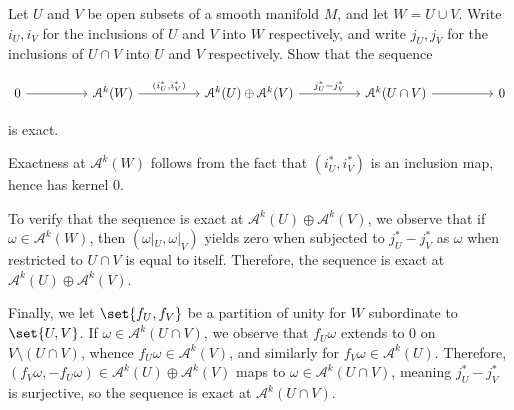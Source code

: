 \documentclass[10pt]{mypackage}
\begin{document}
\begin{problem}[Problem 6]
  Let $U$ and $V$ be open subsets of a smooth manifold $M$, and let $W = U\cup V$. Write $i_U,i_V$ for the inclusions of $U$ and $V$ into $W$ respectively, and write $j_U,j_V$ for the inclusions of $U\cap V$ into $U$ and $V$ respectively. Show that the sequence 
  \begin{center}
\[\begin{tikzcd}
	0 && {\mathcal{A}^k(W)} && {\mathcal{A}^{k}(U)\oplus\mathcal{A}^{k}(V)} && {\mathcal{A}^{k}(U\cap V)} && 0
	\arrow[from=1-1, to=1-3]
	\arrow["{\left(i_U^{\ast},i_V^{\ast}\right)}", from=1-3, to=1-5]
	\arrow["{j_U^{\ast}-j_V^{\ast}}", from=1-5, to=1-7]
	\arrow[from=1-7, to=1-9]
\end{tikzcd}\]
  \end{center}
  is exact.
\end{problem}
\begin{solution}
  Exactness at $\mathcal{A}^{k}\left( W \right)$ follows from the fact that $\left( i_U^{\ast},i_V^{\ast} \right)$ is an inclusion map, hence has kernel $0$.\newline

  To verify that the sequence is exact at $\mathcal{A}^{k}\left( U \right)\oplus \mathcal{A}^{k}\left( V \right)$, we observe that if $\omega\in \mathcal{A}^{k}\left( W \right)$, then $\left( \omega|_{U},\omega|_{V} \right)$ yields zero when subjected to $j_U^{\ast}-j_V^{\ast}$ as $\omega$ when restricted to $U\cap V$ is equal to itself. Therefore, the sequence is exact at $\mathcal{A}^{k}\left( U \right)\oplus \mathcal{A}^{k}\left( V \right)$.\newline

  Finally, we let $\set{f_U,f_V}$ be a partition of unity for $W$ subordinate to $\set{U,V}$. If $\omega\in \mathcal{A}^{k}\left( U\cap V \right)$, we observe that $f_U\omega$ extends to $0$ on $V\setminus \left( U\cap V \right)$, whence $f_U\omega\in \mathcal{A}^{k}\left( V \right)$, and similarly for $f_V\omega\in \mathcal{A}^{k}\left( U \right)$. Therefore, $\left( f_V\omega,-f_U\omega \right)\in \mathcal{A}^{k}\left( U \right)\oplus \mathcal{A}^{k}\left( V \right)$ maps to $\omega\in \mathcal{A}^{k}\left( U\cap V \right)$, meaning $j_U^{\ast}-j_V^{\ast}$ is surjective, so the sequence is exact at $\mathcal{A}^{k}\left( U\cap V \right)$.
\end{solution}
\end{document}
